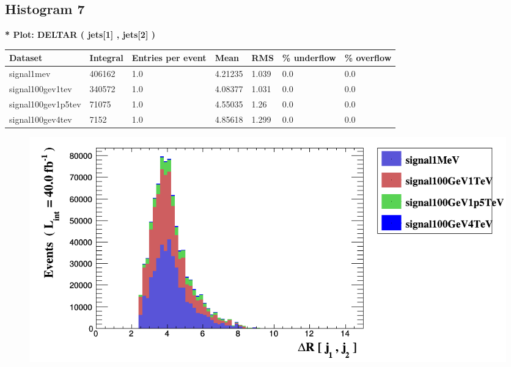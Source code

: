 \documentclass[a4paper, 10pt]{article}
\begin{document}
\subsection{ Histogram 7}

\textbf{* Plot: DELTAR ( jets[1] , jets[2] ) }\\
   \begin{table}[H]
  \begin{center}
    \begin{tabular}{|m{23.0mm}|m{23.0mm}|m{18.0mm}|m{19.0mm}|m{19.0mm}|m{19.0mm}|m{19.0mm}|}
      \hline
      {\cellcolor{yellow}         Dataset}& {\cellcolor{yellow}         Integral}& {\cellcolor{yellow}         Entries per event}& {\cellcolor{yellow}         Mean}& {\cellcolor{yellow}         RMS}& {\cellcolor{yellow}         \% underflow}& {\cellcolor{yellow}         \% overflow}\\
      \hline
      {\cellcolor{white}         signal1mev}& {\cellcolor{white}         406162}& {\cellcolor{white}         1.0}& {\cellcolor{white}         4.21235}& {\cellcolor{white}         1.039}& {\cellcolor{green}         0.0}& {\cellcolor{green}         0.0}\\
      \hline
      {\cellcolor{white}         signal100gev1tev}& {\cellcolor{white}         340572}& {\cellcolor{white}         1.0}& {\cellcolor{white}         4.08377}& {\cellcolor{white}         1.031}& {\cellcolor{green}         0.0}& {\cellcolor{green}         0.0}\\
      \hline
      {\cellcolor{white}         signal100gev1p5tev}& {\cellcolor{white}         71075}& {\cellcolor{white}         1.0}& {\cellcolor{white}         4.55035}& {\cellcolor{white}         1.26}& {\cellcolor{green}         0.0}& {\cellcolor{green}         0.0}\\
      \hline
      {\cellcolor{white}         signal100gev4tev}& {\cellcolor{white}         7152}& {\cellcolor{white}         1.0}& {\cellcolor{white}         4.85618}& {\cellcolor{white}         1.299}& {\cellcolor{green}         0.0}& {\cellcolor{green}         0.0}\\
\hline
    \end{tabular}
  \end{center}
\end{table}

\begin{figure}[H]
  \begin{center}
    \includegraphics[scale=0.45]{selection_6.png}\\
\caption{   }
  \end{center}
\end{figure}
      \newpage
\end{document}
